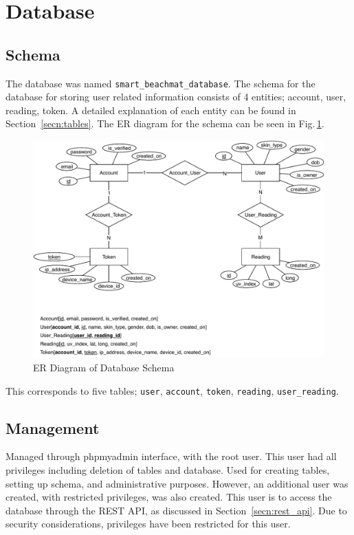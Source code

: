 \documentclass[12pt,openany,a4paper]{book}
\newcommand{\fig}[1]  {Fig.\,\ref{#1}}		%
\newcommand{\secn}[1] {Section~\ref{#1}}	%
\begin{document}
\section{Database}

\subsection{Schema}

The database was named \verb|smart_beachmat_database|. The schema for the database for storing user related information consists of
4 entities; account, user, reading, token. A detailed explanation of each entity
can be found in \secn{secn:tables}. The ER diagram for the schema can be seen in \fig{fig:er}.

\begin{figure}[h]
	\centering\includegraphics[width=\textwidth]{er.pdf}
	\caption{ER Diagram of Database Schema}
	\label{fig:er}
	\end{figure}

This corresponds to five tables; \verb|user|, \verb|account|, \verb|token|, \verb|reading|, \verb|user_reading|.

\subsection{Management}

Managed through phpmyadmin interface, with the root user. This user had all
privileges including deletion of tables and database. Used for creating tables,
setting up schema, and administrative purposes. However, an additional user was
created, with restricted privileges, was also created. This user is to access 
the database through the REST API, as discussed in \secn{secn:rest_api}. Due to security
considerations, privileges have been restricted for this user.
\end{document}
